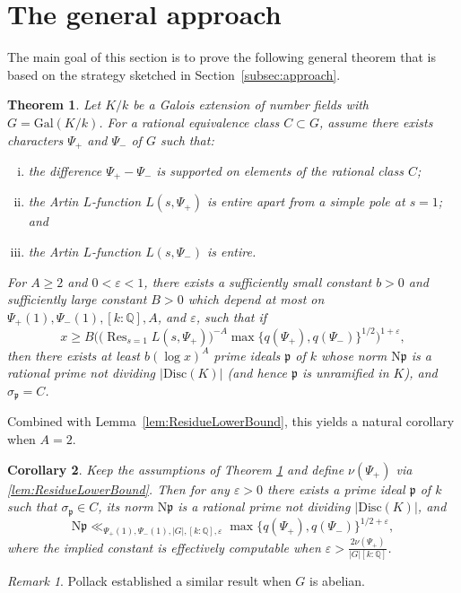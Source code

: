 \documentclass[12pt]{amsart}
\newtheorem{theorem}{Theorem}
\newtheorem{corollary}[theorem]{Corollary}
\theoremstyle{definition} \newtheorem{definition}[theorem]{Definition}
\theoremstyle{example} \newtheorem{example}[theorem]{Example}
\theoremstyle{remark} \newtheorem{remark}{Remark}[theorem]
\numberwithin{equation}{section}
\numberwithin{theorem}{section}
\renewcommand{\epsilon}{\varepsilon}
\renewcommand{\geq}{\geqslant}
\newcommand{\N}{\mathrm{N}} %
\newcommand{\Q}{\mathbb{Q}}
\newcommand{\kp}{\mathfrak{p}}
\newcommand{\Res}{\mathop{\mathrm{Res}}}
\newcommand{\Disc}{\mathrm{Disc}}
\begin{document}
\section{The general approach}
	\label{sec:approach}

	The main goal of this section is to prove the following general theorem that is based on the strategy sketched in Section~\ref{subsec:approach}.
	
 
	\begin{theorem}\label{thm:general-approach}
		Let $K/k$ be a Galois extension of number fields with  $G = \mathrm{Gal}(K/k)$. For a rational equivalence class $C \subset G$, assume there exists characters $\Psi_+$ and $\Psi_-$ of $G$ such that:
		
			\begin{enumerate}[(i)]
				\item the difference $\Psi_+ - \Psi_-$ is supported on elements of the rational class $C$; 
				\item the Artin $L$-function $L(s, \Psi_+)$ is entire apart from a simple pole at $s=1$; and
				\item the Artin $L$-function $L(s, \Psi_-)$ is entire.
			\end{enumerate}
		For $A \geq 2$ and $0  < \epsilon < 1$, there exists a sufficiently small constant $b > 0$ and sufficiently large constant $B > 0$ which depend at most on $\Psi_+(1), \Psi_-(1), [k:\Q], A$, and $\epsilon$, such that  if 
		\begin{equation} \label{eqn:general-approach-threshold}
		x \geq  B \Big( \big(\Res_{s=1} L(s,\Psi_+) \big)^{-A} \max\{q(\Psi_+),q(\Psi_-)\}^{1/2} \Big)^{1+\epsilon}, 
		\end{equation}
		then there exists at least $b (\log x)^A$ prime ideals $\mathfrak{p}$ of $k$ whose norm $\N\kp$ is a rational prime not dividing $|\Disc(K)|$ (and hence $\kp$ is unramified in $K$), and $\sigma_\mathfrak{p} = C$.
	\end{theorem}
 	
 	Combined with Lemma~\ref{lem:ResidueLowerBound}, this yields a natural corollary when $A=2$.
 	
 	\begin{corollary} \label{cor:general-approach} 
		Keep the assumptions of Theorem \ref{thm:general-approach} and define $\nu(\Psi_+)$ via \cref{lem:ResidueLowerBound}. Then for any $\epsilon>0$ there exists a prime ideal $\kp$ of $k$ such that $\sigma_{\kp} \in C$, its norm $\N\kp$ is a rational prime not dividing $|\mathrm{Disc}(K)|$, and 
 		\[
			\N\kp \ll_{\Psi_+(1),\Psi_-(1),|G|,[k:\Q],\epsilon} \max\{ q(\Psi_+), q(\Psi_-)\}^{1/2 + \epsilon} , 
 		\] 
 		where the implied constant is effectively computable when $\epsilon > \frac{2\nu(\Psi_+)}{|G|[k:\mathbb{Q}]}$.  
 	\end{corollary}
	\begin{remark}
		 Pollack \cite[Theorem 4.1]{Pollack-PrimeSplittingAbelian} established a similar result when $G$ is abelian. 
	\end{remark}
	
\end{document}
